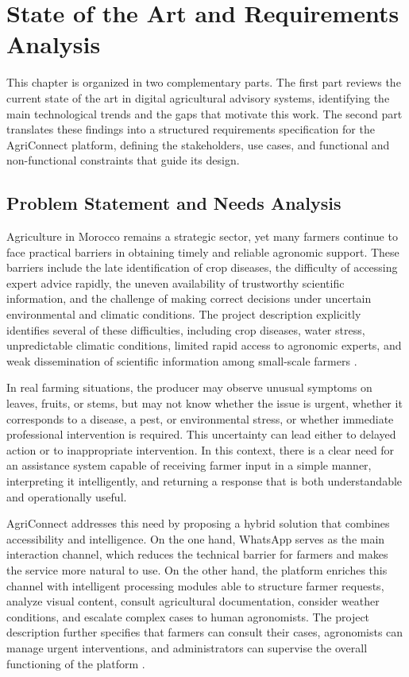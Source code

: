 \chapter{State of the Art and Requirements Analysis}

This chapter is organized in two complementary parts. The first part reviews the current state of the art in digital agricultural advisory systems, identifying the main technological trends and the gaps that motivate this work. The second part translates these findings into a structured requirements specification for the AgriConnect platform, defining the stakeholders, use cases, and functional and non-functional constraints that guide its design.



\section{Problem Statement and Needs Analysis}

Agriculture in Morocco remains a strategic sector, yet many farmers continue to face practical barriers in obtaining timely and reliable agronomic support. These barriers include the late identification of crop diseases, the difficulty of accessing expert advice rapidly, the uneven availability of trustworthy scientific information, and the challenge of making correct decisions under uncertain environmental and climatic conditions. The project description explicitly identifies several of these difficulties, including crop diseases, water stress, unpredictable climatic conditions, limited rapid access to agronomic experts, and weak dissemination of scientific information among small-scale farmers \cite{generationgreen2020,worldbank2024irrigation}.

In real farming situations, the producer may observe unusual symptoms on leaves, fruits, or stems, but may not know whether the issue is urgent, whether it corresponds to a disease, a pest, or environmental stress, or whether immediate professional intervention is required. This uncertainty can lead either to delayed action or to inappropriate intervention. In this context, there is a clear need for an assistance system capable of receiving farmer input in a simple manner, interpreting it intelligently, and returning a response that is both understandable and operationally useful.

AgriConnect addresses this need by proposing a hybrid solution that combines accessibility and intelligence. On the one hand, WhatsApp serves as the main interaction channel, which reduces the technical barrier for farmers and makes the service more natural to use. On the other hand, the platform enriches this channel with intelligent processing modules able to structure farmer requests, analyze visual content, consult agricultural documentation, consider weather conditions, and escalate complex cases to human agronomists. The project description further specifies that farmers can consult their cases, agronomists can manage urgent interventions, and administrators can supervise the overall functioning of the platform \cite{anrt2025}.

